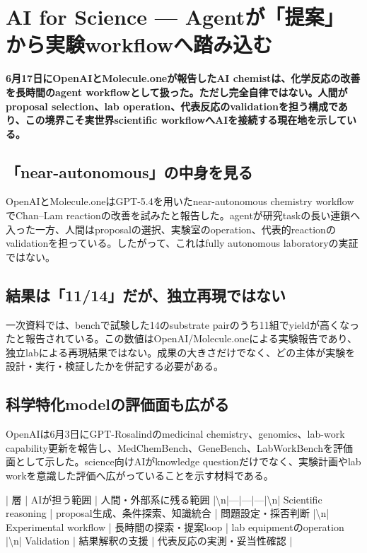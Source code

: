 \section{AI for Science — Agentが「提案」から実験workflowへ踏み込む}
\label{pkg:ai-for-science-june}
\noindent\textbf{6月17日にOpenAIとMolecule.oneが報告したAI chemistは、化学反応の改善を長時間のagent workflowとして扱った。ただし完全自律ではない。人間がproposal selection、lab operation、代表反応のvalidationを担う構成であり、この境界こそ実世界scientific workflowへAIを接続する現在地を示している。}\autocite{src-5ff2f715f1e6}

\subsection{「near-autonomous」の中身を見る}

OpenAIとMolecule.oneはGPT-5.4を用いたnear-autonomous chemistry workflowでChan–Lam reactionの改善を試みたと報告した。agentが研究taskの長い連鎖へ入った一方、人間はproposalの選択、実験室のoperation、代表的reactionのvalidationを担っている。したがって、これはfully autonomous laboratoryの実証ではない。\autocite{src-5ff2f715f1e6}


\subsection{結果は「11/14」だが、独立再現ではない}

一次資料では、benchで試験した14のsubstrate pairのうち11組でyieldが高くなったと報告されている。この数値はOpenAI/Molecule.oneによる実験報告であり、独立labによる再現結果ではない。成果の大きさだけでなく、どの主体が実験を設計・実行・検証したかを併記する必要がある。\autocite{src-5ff2f715f1e6}


\subsection{科学特化modelの評価面も広がる}

OpenAIは6月3日にGPT-Rosalindのmedicinal chemistry、genomics、lab-work capability更新を報告し、MedChemBench、GeneBench、LabWorkBenchを評価面として示した。science向けAIがknowledge questionだけでなく、実験計画やlab workを意識した評価へ広がっていることを示す材料である。\autocite{src-ba562226725d}


| 層 | AIが担う範囲 | 人間・外部系に残る範囲 |\textbackslash{}n|---|---|---|\textbackslash{}n| Scientific reasoning | proposal生成、条件探索、知識統合 | 問題設定・採否判断 |\textbackslash{}n| Experimental workflow | 長時間の探索・提案loop | lab equipmentのoperation |\textbackslash{}n| Validation | 結果解釈の支援 | 代表反応の実測・妥当性確認 |\autocite{src-5ff2f715f1e6,src-ba562226725d}

